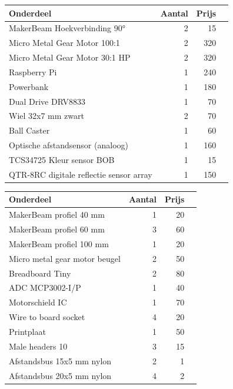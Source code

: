 \documentclass[aspectratio=169,kulak,t,handout]{kulakbeamer} %
\begin{document}
\begin{frame}
	\begin{table}
		\centering
		
		\begin{tabular}{|l|r|r|r|}\hline
			
			\textbf{Onderdeel}&	\textbf{Aantal} &	\textbf{Prijs}	\\\hline
			MakerBeam Hoekverbinding 90°&		2	&15\\\hline
			Micro Metal Gear Motor 100:1 &	2 &320\\\hline
			Micro Metal Gear Motor 30:1 HP&		2	&320\\\hline
			Raspberry Pi&		1		&240\\\hline
			Powerbank&		1&180\\\hline
			Dual Drive DRV8833&		1 &70\\\hline
			Wiel 32x7 mm zwart&		2&70\\\hline
			Ball Caster&		1 &60\\\hline
			Optische afstandsensor (analoog)&		1	&160\\\hline
			TCS34725 Kleur sensor BOB &		1 &15 \\\hline
			QTR-8RC digitale reflectie sensor array &		1	&150\\\hline
		\end{tabular}
	\end{table}
\end{frame}

\begin{frame}
	\begin{table}
		\centering
		
		\begin{tabular}{|l|r|r|r|}\hline
			
			\textbf{Onderdeel}&	\textbf{Aantal} &	\textbf{Prijs}	\\\hline
			MakerBeam profiel 40 mm&		1 &20\\\hline
			MakerBeam profiel 60 mm&		3 	&60\\\hline
			MakerBeam profiel 100 mm&		1	&20\\\hline
			Micro metal gear motor beugel&		2 &50\\\hline
			Breadboard Tiny&		2	&80\\\hline
			ADC MCP3002-I/P&		1 &40\\\hline
			Motorschield IC&		1&	70\\\hline
			Wire to board socket&		4	&20\\\hline
			Printplaat&		1	&50\\\hline
			Male headers 10&		3&15 \\\hline
			Afstandsbus 15x5 mm nylon&		2 &1\\\hline
			Afstandsbus 20x5 mm nylon&		4 &2\\\hline
			
		\end{tabular}
	\end{table}
\end{frame}
\end{document}
